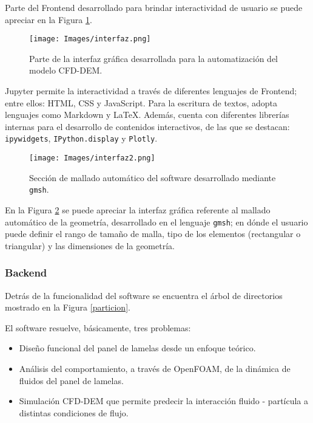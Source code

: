 \noindent
\justify

Parte del Frontend desarrollado para brindar interactividad de usuario se puede apreciar en la Figura \ref{interfaz}.

\begin{figure}[h!]
	\centering
	\texttt{[image: Images/interfaz.png]}
	\caption{Parte de la interfaz gr\'afica desarrollada para la automatizaci\'on del modelo CFD-DEM.}
	\label{interfaz}
\end{figure}

\noindent
\justify


Jupyter permite la interactividad a trav\'es de diferentes lenguajes de Frontend; entre ellos: HTML, CSS y JavaScript. Para la escritura de textos, adopta lenguajes como Markdown y \LaTeX. Adem\'as, cuenta con diferentes librer\'ias internas para el desarrollo de contenidos interactivos, de las que se destacan: \texttt{ipywidgets}, \texttt{IPython.display} y \texttt{Plotly}. 

\begin{figure}[h!]
	\centering
	\texttt{[image: Images/interfaz2.png]}
	\caption{Secci\'on de mallado autom\'atico del software desarrollado mediante \texttt{gmsh}.}
	\label{mallado:gmsh}
\end{figure}

\noindent
\justify

En la Figura \ref{mallado:gmsh} se puede apreciar la interfaz gr\'afica referente al mallado autom\'atico de la geometr\'ia, desarrollado en el lenguaje \texttt{gmsh}; en d\'onde el usuario puede definir el rango de tama\~no de malla, tipo de los elementos (rectangular o triangular) y las dimensiones de la geometr\'ia.

\newpage

\subsubsection{Backend}

\noindent
\justify

Detr\'as de la funcionalidad del software se encuentra el \'arbol de directorios mostrado en la Figura \ref{particion}.



\newpage

\noindent
\justify

El software resuelve, b\'asicamente, tres problemas:

\begin{itemize}
	\item Dise\~no funcional del panel de lamelas desde un enfoque te\'orico.
	\item An\'alisis del comportamiento, a trav\'es de OpenFOAM, de la din\'amica de fluidos del panel de lamelas.
	\item Simulaci\'on CFD-DEM que permite predecir la interacci\'on fluido - part\'icula a distintas condiciones de flujo.
\end{itemize}

